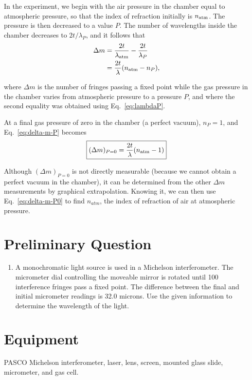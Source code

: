 In the experiment, we begin with the air pressure in the chamber 
equal to atmospheric pressure, so that the index of refraction 
initially is $n_{\rm atm}$. The pressure is then decreased to a value 
$P$. The number of wavelengths inside the chamber decreases to 
$2t/\lambda_P$, and it follows that
\begin{align}
\Delta m &= \frac{2t}{\lambda_{\rm atm}} - \frac{2t}{\lambda_P} \nonumber \\ 
 &= \frac{2t}{\lambda} ( n_{\rm atm} - n_P ),
\label{eq:delta-m-P}
\end{align}

\noindent where $\Delta m$ is the number of fringes passing a fixed point while
the gas pressure in the chamber varies from atmospheric pressure to a pressure
$P$, and where the second equality was obtained using Eq.~\ref{eq:lambdaP}.

At a final gas pressure of zero in the chamber (a perfect vacuum), 
$n_P = 1$, and Eq.~\ref{eq:delta-m-P} becomes
\begin{equation}
\boxed{ (\Delta m)_{P=0} = \frac{2t}{\lambda}(n_{\rm atm} - 1)}
\label{eq:delta-m-P0}
\end{equation}

Although $(\Delta m)_{P=0}$ is not directly measurable (because we cannot obtain
a perfect vacuum in the chamber), it can be determined from the other $\Delta m$
measurements by graphical extrapolation. Knowing it, we can then use
Eq.~\ref{eq:delta-m-P0} to find $n_{atm}$, the index of refraction of air at
atmospheric pressure.

\section{Preliminary Question}

\begin{enumerate}
\item A monochromatic light source is used in a Michelson interferometer.  The
  micrometer dial controlling the moveable mirror is rotated until 100
  interference fringes pass a fixed point. The difference between the final and
  initial micrometer readings is 32.0 microns. Use the given information to determine
  the wavelength of the light.
\end{enumerate}

\section{Equipment}
PASCO Michelson interferometer, laser, lens, screen, 
mounted glass slide, micrometer, and gas cell.

